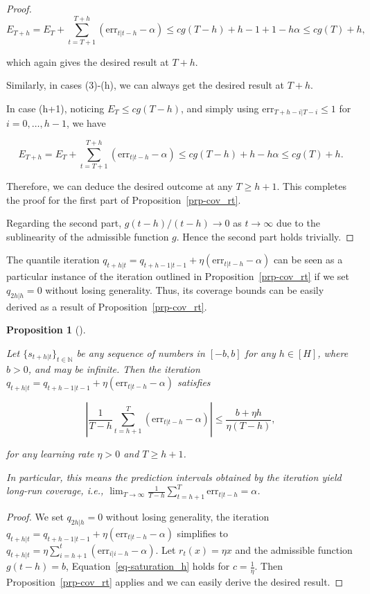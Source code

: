 \documentclass[
  11pt,
  a4paper,
]{article}
\theoremstyle{plain}
\theoremstyle{plain}
\newtheorem{proposition}{Proposition}[section]
\theoremstyle{remark}
\begin{document}
\begin{proof}
\[
E_{T+h} = E_T+\sum_{t=T+1}^{T+h}(\mathrm{err}_{t|t-h}-\alpha) \leq cg(T-h)+h-1+1-h\alpha \leq cg(T)+h,
\]

which again gives the desired result at \(T+h\).

Similarly, in cases (3)-(h), we can always get the desired result at
\(T+h\).

In case (h+1), noticing \(E_T \leq cg(T-h)\), and simply using
\(\mathrm{err}_{T+h-i|T-i} \leq 1\) for \(i=0,\ldots,h-1\), we have

\[
E_{T+h} = E_T+\sum_{t=T+1}^{T+h}(\mathrm{err}_{t|t-h}-\alpha) \leq cg(T-h)+h-h\alpha \leq cg(T)+h.
\]

Therefore, we can deduce the desired outcome at any \(T \geq h+1\). This
completes the proof for the first part of Proposition~\ref{prp-cov_rt}.

Regarding the second part, \(g(t-h)/(t-h) \rightarrow 0\) as
\(t \rightarrow \infty\) due to the sublinearity of the admissible
function \(g\). Hence the second part holds trivially.
\end{proof}

The quantile iteration
\(q_{t+h|t}=q_{t+h-1|t-1}+\eta \left(\mathrm{err}_{t|t-h}-\alpha\right)\)
can be seen as a particular instance of the iteration outlined in
Proposition~\ref{prp-cov_rt} if we set \(q_{2h|h}=0\) without losing
generality. Thus, its coverage bounds can be easily derived as a result
of Proposition~\ref{prp-cov_rt}.

\begin{proposition}[]\protect\hypertarget{prp-cov_qt}{}\label{prp-cov_qt}

Let \(\{s_{t+h|t}\}_{t\in\mathbb{N}}\) be any sequence of numbers in
\([-b, b]\) for any \(h\in[H]\), where \(b>0\), and may be infinite.
Then the iteration
\(q_{t+h|t}=q_{t+h-1|t-1}+\eta \left(\mathrm{err}_{t|t-h}-\alpha\right)\)
satisfies

\[
\left|\frac{1}{T-h}\sum_{t=h+1}^{T}\left(\mathrm{err}_{t|t-h}-\alpha\right)\right| \leq \frac{b + \eta h}{\eta\left(T-h\right)},
\]

for any learning rate \(\eta > 0\) and \(T \geq h+1\).

In particular, this means the prediction intervals obtained by the
iteration yield long-run coverage, i.e.,
\(\lim _{T \rightarrow \infty} \frac{1}{T-h} \sum_{t=h+1}^T \mathrm{err}_{t|t-h} = \alpha\).

\end{proposition}

\begin{proof}
We set \(q_{2h|h}=0\) without losing generality, the iteration
\(q_{t+h|t}=q_{t+h-1|t-1}+\eta \left(\mathrm{err}_{t|t-h}-\alpha\right)\)
simplifies to
\(q_{t+h|t}=\eta \sum_{i=h+1}^{t}\left(\mathrm{err}_{i|i-h}-\alpha\right)\).
Let \(r_t(x) = \eta x\) and the admissible function \(g(t-h) = b\),
Equation~\ref{eq-saturation_h} holds for \(c=\frac{1}{\eta}\). Then
Proposition~\ref{prp-cov_rt} applies and we can easily derive the
desired result.
\end{proof}
\end{document}
